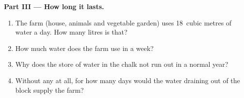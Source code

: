 \begin{problem}
\medskip
\noindent\textbf{Part III --- How long it lasts.}
\begin{enumerate}[resume]
  \item The farm (house, animals and vegetable garden) uses 18~cubic metres
        of water a day. How many litres is that?
  \item How much water does the farm use in a week?
  \item Why does the store of water in the chalk not run out in a normal
        year?
  \item Without any  at all, for how many days would the water draining
        out of the block supply the farm?
\end{enumerate}
\end{problem}

